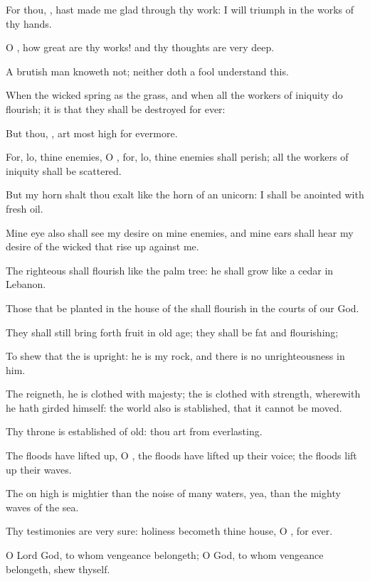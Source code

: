 \Verse For thou, \LORD, hast made me glad through thy work: I will triumph in the works of thy hands.

\Verse O \LORD, how great are thy works! and thy thoughts are very deep.

\Verse A brutish man knoweth not; neither doth a fool understand this.

\Verse When the wicked spring as the grass, and when all the workers of iniquity do flourish; it is that they shall be destroyed for ever:

\Verse But thou, \LORD, art most high for evermore.

\Verse For, lo, thine enemies, O \LORD, for, lo, thine enemies shall perish; all the workers of iniquity shall be scattered.

\Verse But my horn shalt thou exalt like the horn of an unicorn: I shall be anointed with fresh oil.

\Verse Mine eye also shall see my desire on mine enemies, and mine ears shall hear my desire of the wicked that rise up against me.

\Verse The righteous shall flourish like the palm tree: he shall grow like a cedar in Lebanon.

\Verse Those that be planted in the house of the \LORD shall flourish in the courts of our God.

\Verse They shall still bring forth fruit in old age; they shall be fat and flourishing;

\Verse To shew that the \LORD is upright: he is my rock, and there is no unrighteousness in him.




\Chapter
\Verse The \LORD reigneth, he is clothed with majesty; the \LORD is clothed with strength, wherewith he hath girded himself: the world also is stablished, that it cannot be moved.

\Verse Thy throne is established of old: thou art from everlasting.

\Verse The floods have lifted up, O \LORD, the floods have lifted up their voice; the floods lift up their waves.

\Verse The \LORD on high is mightier than the noise of many waters, yea, than the mighty waves of the sea.

\Verse Thy testimonies are very sure: holiness becometh thine house, O \LORD, for ever.




\Chapter
\Verse O Lord God, to whom vengeance belongeth; O God, to whom vengeance belongeth, shew thyself.

